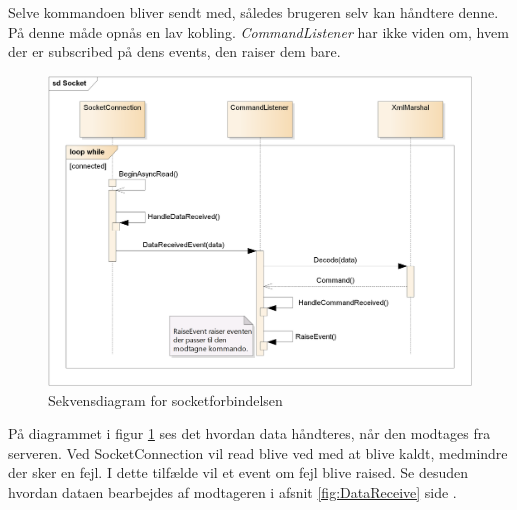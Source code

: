 Selve kommandoen bliver sendt med, således brugeren selv kan håndtere denne.
På denne måde opnås en lav kobling. \textit{CommandListener} har ikke viden om, hvem der er subscribed på dens events, den raiser dem bare.

\begin{figure}[H]
	\centering
	\includegraphics[width=1\textwidth]{Systemdesign/SharedLib/Images/Socket.png}
	\caption{Sekvensdiagram for socketforbindelsen}
	\label{fig:sockit}
\end{figure}

På diagrammet i figur \ref{fig:sockit} ses det hvordan data håndteres, når den modtages fra serveren. Ved SocketConnection vil read blive ved med at blive kaldt, medmindre der sker en fejl. I dette tilfælde vil et event om fejl blive raised. Se desuden hvordan dataen bearbejdes af modtageren i afsnit \ref{fig:DataReceive} side \pageref{fig:DataReceive}.
 